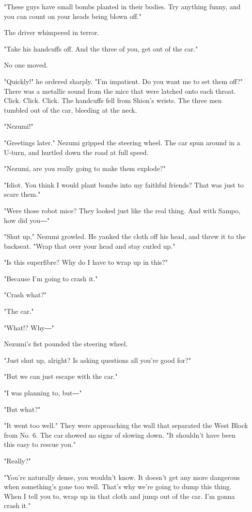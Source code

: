 "These guys have small bombs planted in their bodies. Try anything
funny, and you can count on your heads being blown off."

The driver whimpered in terror.

"Take his handcuffs off. And the three of you, get out of the car."

No one moved.

"Quickly!" he ordered sharply. "I'm impatient. Do you want me to set
them off?" There was a metallic sound from the mice that were latched
onto each throat. Click. Click. Click. The handcuffs fell from Shion's
wrists. The three men tumbled out of the car, bleeding at the neck.

"Nezumi!"

"Greetings later." Nezumi gripped the steering wheel. The car spun
around in a U-turn, and hurtled down the road at full speed.

"Nezumi, are you really going to make them explode?"

"Idiot. You think I would plant bombs into my faithful friends? That was
just to scare them."

"Were those robot mice? They looked just like the real thing. And with
Sampo, how did you―"

"Shut up," Nezumi growled. He yanked the cloth off his head, and threw
it to the backseat. "Wrap that over your head and stay curled up."

"Is this superfibre? Why do I have to wrap up in this?"

"Because I'm going to crash it."

"Crash what?"

"The car."

"What!? Why―"

Nezumi's fist pounded the steering wheel.

"Just shut up, alright? Is asking questions all you're good for?"

"But we can just escape with the car."

"I was planning to, but―"

"But what?"

"It went too well." They were approaching the wall that separated the
West Block from No. 6. The car showed no signs of slowing down. "It
shouldn't have been this easy to rescue you."

"Really?"

"You're naturally dense, you wouldn't know. It doesn't get any more
dangerous when something's gone too well. That's why we're going to dump
this thing. When I tell you to, wrap up in that cloth and jump out of
the car. I'm gonna crash it."

